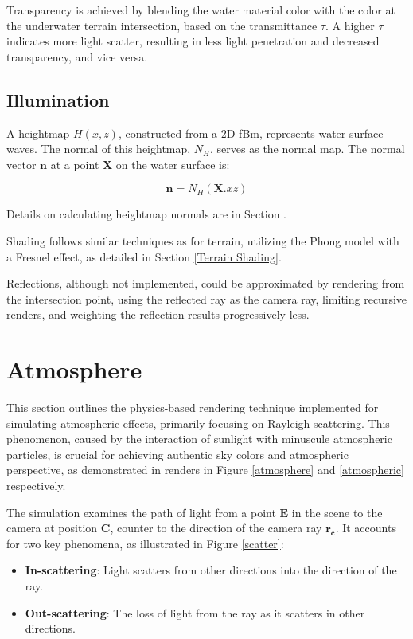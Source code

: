 Transparency is achieved by blending the water material color with the color at the underwater terrain intersection, based on the transmittance $\tau$. A higher $\tau$ indicates more light scatter, resulting in less light penetration and decreased transparency, and vice versa.

\subsection{Illumination}
\label{Water Shading}

A heightmap $H(x,z)$, constructed from a 2D fBm, represents water surface waves. The normal of this heightmap, $N_H$, serves as the normal map. The normal vector $\mathbf{n}$ at a point $\mathbf{X}$ on the water surface is:

\begin{equation}
\mathbf{n}= N_{H}(\mathbf{X}.xz)
\end{equation}

Details on calculating heightmap normals are in Section .

Shading follows similar techniques as for terrain, utilizing the Phong model with a Fresnel effect, as detailed in Section \ref{Terrain Shading}. 

Reflections, although not implemented, could be approximated by rendering from the intersection point, using the reflected ray as the camera ray, limiting recursive renders, and weighting the reflection results progressively less. 

\section{Atmosphere}
\label{Atmosphere}

This section outlines the physics-based rendering technique implemented for simulating atmospheric effects, primarily focusing on Rayleigh scattering. This phenomenon, caused by the interaction of sunlight with minuscule atmospheric particles, is crucial for achieving authentic sky colors and atmospheric perspective, as demonstrated in renders in Figure \ref{atmosphere}  and \ref{atmospheric} respectively.

The simulation examines the path of light from a point $\mathbf{E}$ in the scene to the camera at position $\mathbf{C}$, counter to the direction of the camera ray $\mathbf{r_c}$. It accounts for two key phenomena, as illustrated in Figure \ref{scatter}:
\begin{itemize}
    \item \textbf{In-scattering}: Light scatters from other directions into the direction of the ray.
    \item \textbf{Out-scattering}: The loss of light from the ray as it scatters in other directions.
\end{itemize}


